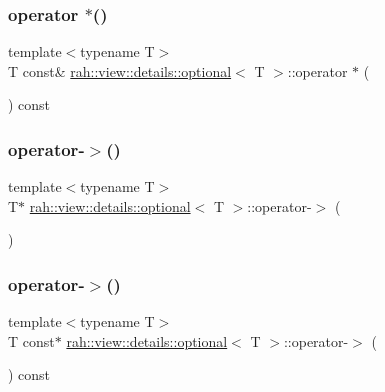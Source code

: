 \subsubsection{\texorpdfstring{operator $\ast$()}{operator *()}\hspace{0.1cm}{\footnotesize\ttfamily [2/2]}}
{\footnotesize\ttfamily template$<$typename T$>$ \\
T const\& \mbox{\hyperlink{structrah_1_1view_1_1details_1_1optional}{rah\+::view\+::details\+::optional}}$<$ T $>$\+::operator $\ast$ (\begin{DoxyParamCaption}{ }\end{DoxyParamCaption}) const\hspace{0.3cm}{\ttfamily [inline]}}

\mbox{\label{structrah_1_1view_1_1details_1_1optional_ab8f628f4039e5f3a86262d710b4a885c}} 
\subsubsection{\texorpdfstring{operator-\/$>$()}{operator->()}\hspace{0.1cm}{\footnotesize\ttfamily [1/2]}}
{\footnotesize\ttfamily template$<$typename T$>$ \\
T$\ast$ \mbox{\hyperlink{structrah_1_1view_1_1details_1_1optional}{rah\+::view\+::details\+::optional}}$<$ T $>$\+::operator-\/$>$ (\begin{DoxyParamCaption}{ }\end{DoxyParamCaption})\hspace{0.3cm}{\ttfamily [inline]}}

\mbox{\label{structrah_1_1view_1_1details_1_1optional_aa4e2ccfe9217c1b960092cd44c9305ca}} 
\subsubsection{\texorpdfstring{operator-\/$>$()}{operator->()}\hspace{0.1cm}{\footnotesize\ttfamily [2/2]}}
{\footnotesize\ttfamily template$<$typename T$>$ \\
T const$\ast$ \mbox{\hyperlink{structrah_1_1view_1_1details_1_1optional}{rah\+::view\+::details\+::optional}}$<$ T $>$\+::operator-\/$>$ (\begin{DoxyParamCaption}{ }\end{DoxyParamCaption}) const\hspace{0.3cm}{\ttfamily [inline]}}

